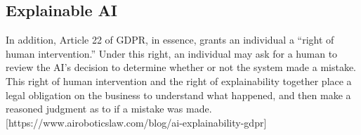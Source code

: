 \subsection{Explainable AI}
In addition, Article 22 of GDPR, in essence, grants an individual a “right of human intervention.” Under this right, an individual may ask for a human to review the AI’s decision to determine whether or not the system made a mistake. This right of human intervention and the right of explainability together place a legal obligation on the business to understand what happened, and then make a reasoned judgment as to if a mistake was made.[https://www.airoboticslaw.com/blog/ai-explainability-gdpr]